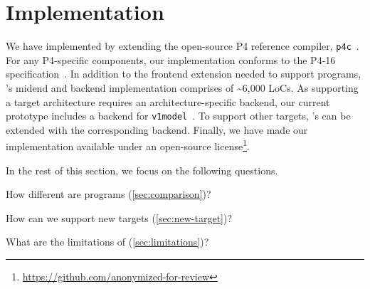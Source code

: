 \documentclass[letterpaper,twocolumn,10pt]{article}
\begin{document}




\section{Implementation}
\label{sec:implementation}
We have implemented \ucomp by extending the open-source P4 reference
compiler, \texttt{p4c}~\cite{p4c}. For any P4-specific components, our
implementation conforms to the P4-16 specification~\cite{p4lang}. In
addition to the frontend extension needed to support \ulang programs,
\ucomp's midend and backend implementation comprises of
\textasciitilde 6,000 LoCs. As supporting a target architecture
requires an architecture-specific backend, our current prototype
includes a backend for \texttt{v1model}~\cite{v1model.p4}. To support
other targets, \ucomp's can be extended with the corresponding
backend. Finally, we have made our implementation available under an
open-source
license\footnote{\url{https://github.com/anonymized-for-review}}.

In the rest of this section, we focus on the following questions.
\begin{enumerate*}[label=(\roman*)]
  \item How different are \ulang programs (\cref{sec:comparison})?
  \item How can we support new targets (\cref{sec:new-target})?
  \item What are the limitations of \ulang (\cref{sec:limitations})?
\end{enumerate*}
\end{document}
